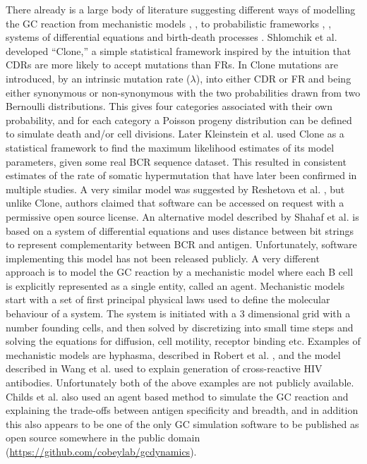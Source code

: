 There already is a large body of literature suggesting different ways of modelling the GC reaction from mechanistic models \cite{Childs_Baskerville_Cobey_2015}, \cite{robert2017simulate}, to probabilistic frameworks \cite{shlomchik1998clone}, \cite{Reshetova_2017}, systems of differential equations \cite{shahaf2008antigen} and birth-death processes \cite{Balelli_2016}.
Shlomchik et al. \cite{shlomchik1998clone} developed ``Clone,'' a simple statistical framework inspired by the intuition that CDRs are more likely to accept mutations than FRs.
In Clone mutations are introduced, by an intrinsic mutation rate ($\lambda$), into either CDR or FR and being either synonymous or non-synonymous with the two probabilities drawn from two Bernoulli distributions.
This gives four categories associated with their own probability, and for each category a Poisson progeny distribution can be defined to simulate death and/or cell divisions.
Later Kleinstein et al. \cite{kleinstein2003estimating} used Clone as a statistical framework to find the maximum likelihood estimates of its model parameters, given some real BCR sequence dataset.
This resulted in consistent estimates of the rate of somatic hypermutation that have later been confirmed in multiple studies.
A very similar model was suggested by Reshetova et al. \cite{Reshetova_2017}, but unlike Clone, authors claimed that software can be accessed on request with a permissive open source license.
An alternative model described by Shahaf et al. \cite{shahaf2008antigen} is based on a system of differential equations and uses distance between bit strings to represent complementarity between BCR and antigen.
Unfortunately, software implementing this model has not been released publicly.
A very different approach is to model the GC reaction by a mechanistic model where each B cell is explicitly represented as a single entity, called an agent.
Mechanistic models start with a set of first principal physical laws used to define the molecular behaviour of a system.
The system is initiated with a 3 dimensional grid with a number founding cells, and then solved by discretizing into small time steps and solving the equations for diffusion, cell motility, receptor binding etc.
Examples of mechanistic models are hyphasma, described in Robert et al. \cite{robert2017simulate}, and the model described in Wang et al. \cite{wang2015manipulating} used to explain generation of cross-reactive HIV antibodies.
Unfortunately both of the above examples are not publicly available.
Childs et al. \cite{Childs_Baskerville_Cobey_2015} also used an agent based method to simulate the GC reaction and explaining the trade-offs between antigen specificity and breadth, and in addition this also appears to be one of the only GC simulation software to be published as open source somewhere in the public domain (\url{https://github.com/cobeylab/gcdynamics}).

